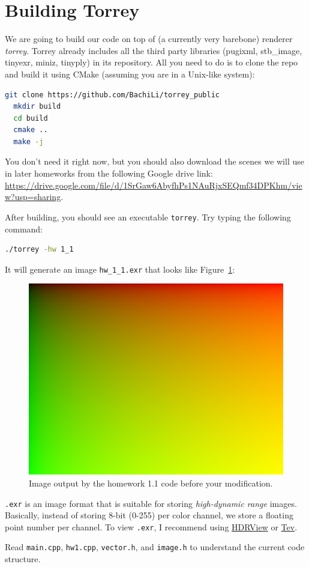 \section{Building Torrey}
We are going to build our code on top of (a currently very barebone) renderer \emph{torrey}. Torrey already includes all the third party libraries (pugixml, stb\_image, tinyexr, miniz, tinyply) in its repository.
All you need to do is to clone the repo and build it using CMake (assuming you are in a Unix-like system):
\begin{lstlisting}[language=bash]
  git clone https://github.com/BachiLi/torrey_public
  mkdir build
  cd build
  cmake ..
  make -j
\end{lstlisting}
You don't need it right now, but you should also download the scenes we will use in later homeworks from the following Google drive link: \url{https://drive.google.com/file/d/1SrGaw6AbyfhPs1NAuRjxSEQmf34DPKhm/view?usp=sharing}.

After building, you should see an executable \lstinline{torrey}. Try typing the following command:
\begin{lstlisting}[language=bash]
  ./torrey -hw 1_1
\end{lstlisting}
It will generate an image \lstinline{hw_1_1.exr} that looks like Figure~\ref{fig:hw_1_1_before}:
\begin{figure}[ht]
    \centering
    \includegraphics[width=0.5\linewidth]{imgs/hw_1_1_before.png}
    \caption{Image output by the homework 1.1 code before your modification.}
    \label{fig:hw_1_1_before}
\end{figure}

\lstinline{.exr} is an image format that is suitable for storing \emph{high-dynamic range} images. Basically, instead of storing 8-bit (0-255) per color channel, we store a floating point number per channel. To view \lstinline{.exr}, I recommend using \href{https://github.com/wkjarosz/hdrview}{HDRView} or \href{https://github.com/Tom94/tev}{Tev}.

Read \lstinline{main.cpp}, \lstinline{hw1.cpp}, \lstinline{vector.h}, and \lstinline{image.h} to understand the current code structure.

